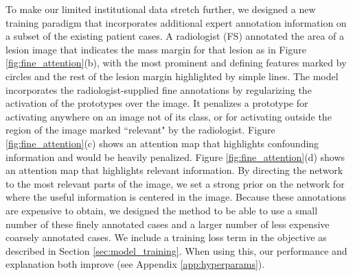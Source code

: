 \documentclass[11pt]{article}
\begin{document}
To make our limited institutional data stretch further, we designed a new training paradigm that incorporates additional expert annotation information on a subset of the existing patient cases. A radiologist (FS) annotated the area of a lesion image that indicates the mass margin for that lesion as in Figure \ref{fig:fine_attention}(b), with the most prominent and defining features marked by circles and the rest of the lesion margin highlighted by simple lines. The model incorporates the radiologist-supplied fine annotations by regularizing the activation of the prototypes over the image. It penalizes a prototype for activating anywhere on an image not of its class, or for activating  outside the region of the image marked ``relevant" by the radiologist. Figure \ref{fig:fine_attention}(c) shows an attention map that highlights confounding information and would be heavily penalized. Figure \ref{fig:fine_attention}(d) shows an attention map that highlights relevant information. By directing the network to the most relevant parts of the image, we set a strong prior on the network for where the useful information is centered in the image. Because these annotations are expensive to obtain, we designed the method to be able to use a small number of these finely annotated cases and a larger number of less expensive coarsely annotated cases. We include a training loss term in the objective as described in Section \ref{sec:model_training}. When using this, our performance and explanation both improve (see Appendix \ref{app:hyperparams}).
\end{document}
